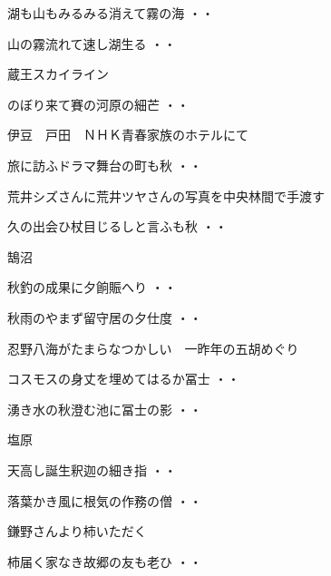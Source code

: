 \begin{shiika}湖も山もみるみる消えて霧の海
\hfill{・・}\end{shiika}
\begin{shiika}山の霧流れて速し湖生る
\hfill{・・}\end{shiika}
\vspace{0.4cm}
蔵王スカイライン
\begin{shiika}のぼり来て賽の河原の細芒
\hfill{・・}\end{shiika}
\vspace{0.4cm}
伊豆　戸田　ＮＨＫ青春家族のホテルにて
\begin{shiika}旅に訪ふドラマ舞台の町も秋
\hfill{・・}\end{shiika}
\vspace{0.4cm}
荒井シズさんに荒井ツヤさんの写真を中央林間で手渡す
\begin{shiika}久の出会ひ杖目じるしと言ふも秋
\hfill{・・}\end{shiika}
\vspace{0.4cm}
鵠沼
\begin{shiika}秋釣の成果に夕餉賑へり
\hfill{・・}\end{shiika}
\begin{shiika}秋雨のやまず留守居の夕仕度
\hfill{・・}\end{shiika}
\vspace{0.4cm}
忍野八海がたまらなつかしい　一昨年の五胡めぐり
\begin{shiika}コスモスの身丈を埋めてはるか冨士
\hfill{・・}\end{shiika}
\begin{shiika}湧き水の秋澄む池に冨士の影
\hfill{・・}\end{shiika}
\vspace{0.4cm}
塩原
\begin{shiika}天高し誕生釈迦の細き指
\hfill{・・}\end{shiika}
\begin{shiika}落葉かき風に根気の作務の僧
\hfill{・・}\end{shiika}
\vspace{0.4cm}
鎌野さんより柿いただく
\begin{shiika}柿届く家なき故郷の友も老ひ
\hfill{・・}\end{shiika}
